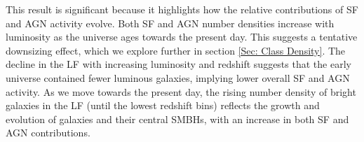 This result is significant because it highlights how the relative contributions of SF and AGN activity evolve. Both SF and AGN number densities increase with luminosity as the universe ages towards the present day. This suggests a tentative downsizing effect, which we explore further in section \ref{Sec: Class Density}. The decline in the LF with increasing luminosity and redshift suggests that the early universe contained fewer luminous galaxies, implying lower overall SF and AGN activity. As we move towards the present day, the rising number density of bright galaxies in the LF (until the lowest redshift bins) reflects the growth and evolution of galaxies and their central SMBHs, with an increase in both SF and AGN contributions.






